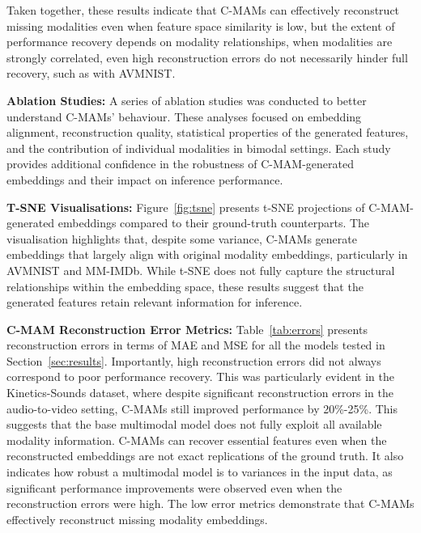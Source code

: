 Taken together, these results indicate that C-MAMs can effectively reconstruct missing modalities even when feature space similarity is low, but the extent of performance recovery depends on modality relationships, when modalities are strongly correlated, even high reconstruction errors do not necessarily hinder full recovery, such as with AVMNIST.

\textbf{Ablation Studies:}
A series of ablation studies was conducted to better understand C-MAMs' behaviour. These analyses focused on embedding alignment, reconstruction quality, statistical properties of the generated features, and the contribution of individual modalities in bimodal settings. Each study provides additional confidence in the robustness of C-MAM-generated embeddings and their impact on inference performance.

\textbf{T-SNE Visualisations:}
Figure~\ref{fig:tsne} presents t-SNE projections of C-MAM-generated embeddings compared to their ground-truth counterparts. The visualisation highlights that, despite some variance, C-MAMs generate embeddings that largely align with original modality embeddings, particularly in AVMNIST and MM-IMDb. While t-SNE does not fully capture the structural relationships within the embedding space, these results suggest that the generated features retain relevant information for inference.


\textbf{C-MAM Reconstruction Error Metrics:} Table~\ref{tab:errors} presents reconstruction errors in terms of MAE and MSE for all the models tested in Section~\ref{sec:results}. Importantly, high reconstruction errors did not always correspond to poor performance recovery. This was particularly evident in the Kinetics-Sounds dataset, where despite significant reconstruction errors in the audio-to-video setting, C-MAMs still improved performance by 20\%-25\%. This suggests that the base multimodal model does not fully exploit all available modality information. C-MAMs can recover essential features even when the reconstructed embeddings are not exact replications of the ground truth. It also indicates how robust a multimodal model is to variances in the input data, as significant performance improvements were observed even when the reconstruction errors were high. The low error metrics demonstrate that C-MAMs effectively reconstruct missing modality embeddings.

